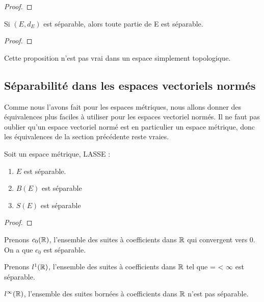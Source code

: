 \begin{proof}
	
\end{proof}

\begin{proposition}
	Si $(E, d_{E})$ est séparable, alors toute partie de E est séparable.
\end{proposition}

\begin{proof}
	
\end{proof}

\begin{remarque}
	Cette proposition n'est pas vrai dans un espace simplement topologique.
\end{remarque}

\subsection{Séparabilité dans les espaces vectoriels normés}

Comme nous l'avons fait pour les espaces métriques, nous allons donner des
équivalences plus faciles à utiliser pour les espaces vectoriel normés. Il ne
faut pas oublier qu'un espace vectoriel normé est en particulier un espace
métrique, donc les équivalences de la section précédente reste vraies.

\begin{proposition}
	Soit  un espace métrique, LASSE :
	\begin{enumerate}
		\item $E$ est séparable.
		\item $B(E)$ est séparable
		\item $S(E)$ est séparable
	\end{enumerate}
\end{proposition}

\begin{proof}
	
\end{proof}

\begin{exemple}
	Prenons $c_{0}(\mathbb{R})$, l'ensemble des suites à coefficients dans $\mathbb{R}$
	qui convergent vers 0. On a que $c_{0}$ est séparable.
\end{exemple}

\begin{exemple}
	Prenons $l^{1}(\mathbb{R})$, l'ensemble des suites à coefficients dans $\mathbb{R}$
	tel que  =  < $\infty$ est
	séparable.
\end{exemple}

\begin{exemple}
	$l^{\infty}(\mathbb{R})$, l'ensemble des suites bornées à coefficients dans
	$\mathbb{R}$ n'est pas séparable.
\end{exemple}

